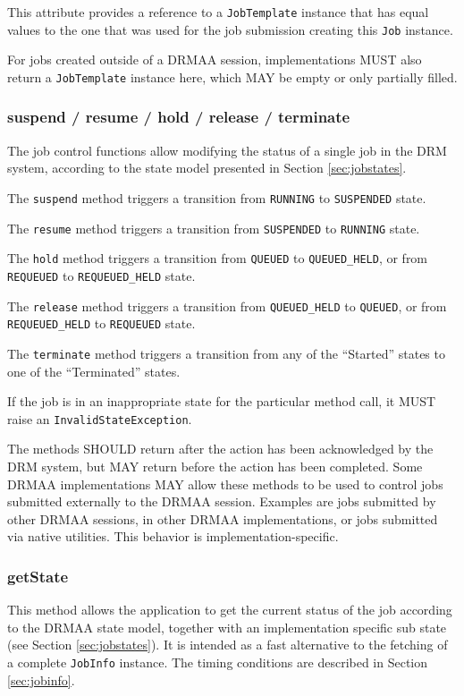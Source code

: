 \documentclass{article}
\newcommand{\h}[1]{\lstinline|#1|}
\begin{document}
This attribute provides a reference to a \h{JobTemplate} instance that has equal values to the one that was used for the job submission creating this \h{Job} instance.

For jobs created outside of a DRMAA session, implementations MUST also return a \h{JobTemplate} instance here, which MAY be empty or only partially filled.
 
\subsubsection{suspend / resume / hold / release / terminate}
\label{sec:jobcontrolfunctions}

The job control functions allow modifying the status of a single job in the DRM system, according to the state model presented in Section \ref{sec:jobstates}. 

The \h{suspend} method triggers a transition from \h{RUNNING} to \h{SUSPENDED} state. 

The \h{resume} method triggers a transition from \h{SUSPENDED} to \h{RUNNING} state. 

The \h{hold} method triggers a transition from \h{QUEUED} to \h{QUEUED_HELD}, or from \h{REQUEUED} to \h{REQUEUED_HELD} state. 

The \h{release} method triggers a transition from \h{QUEUED_HELD} to \h{QUEUED}, or from \h{REQUEUED_HELD} to \h{REQUEUED} state. 

The \h{terminate} method triggers a transition from any of the \enquote{Started} states to one of the \enquote{Terminated} states. 

If the job is in an inappropriate state for the particular method call, it MUST raise an \h{InvalidStateException}.

The methods SHOULD return after the action has been acknowledged by the DRM system, but MAY return before the action has been completed. Some DRMAA implementations MAY allow these methods to be used to control jobs submitted externally to the DRMAA session. Examples are jobs submitted by other DRMAA sessions, in other DRMAA implementations, or jobs submitted via native utilities. This behavior is implementation-specific.

\subsubsection{getState}

This method allows the application to get the current status of the job according to the DRMAA state model, together with an implementation specific sub state (see Section \ref{sec:jobstates}). It is intended as a fast alternative to the fetching of a complete \h{JobInfo} instance. The timing conditions are described in Section \ref{sec:jobinfo}.
\end{document}
